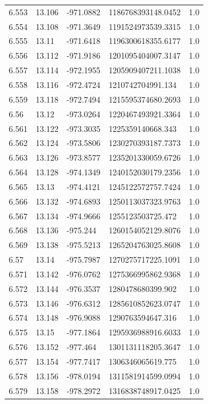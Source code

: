 \begin{tabular}{lllll}
6.553 & 13.106 & -971.0882 & 1186768393148.0452 & 1.0 \\
6.554 & 13.108 & -971.3649 & 1191524973539.3315 & 1.0 \\
6.555 & 13.11 & -971.6418 & 1196300618355.6177 & 1.0 \\
6.556 & 13.112 & -971.9186 & 1201095404007.3147 & 1.0 \\
6.557 & 13.114 & -972.1955 & 1205909407211.1038 & 1.0 \\
6.558 & 13.116 & -972.4724 & 1210742704991.134 & 1.0 \\
6.559 & 13.118 & -972.7494 & 1215595374680.2693 & 1.0 \\
6.56 & 13.12 & -973.0264 & 1220467493921.3364 & 1.0 \\
6.561 & 13.122 & -973.3035 & 1225359140668.343 & 1.0 \\
6.562 & 13.124 & -973.5806 & 1230270393187.7373 & 1.0 \\
6.563 & 13.126 & -973.8577 & 1235201330059.6726 & 1.0 \\
6.564 & 13.128 & -974.1349 & 1240152030179.2356 & 1.0 \\
6.565 & 13.13 & -974.4121 & 1245122572757.7424 & 1.0 \\
6.566 & 13.132 & -974.6893 & 1250113037323.9763 & 1.0 \\
6.567 & 13.134 & -974.9666 & 1255123503725.472 & 1.0 \\
6.568 & 13.136 & -975.244 & 1260154052129.8076 & 1.0 \\
6.569 & 13.138 & -975.5213 & 1265204763025.8608 & 1.0 \\
6.57 & 13.14 & -975.7987 & 1270275717225.1091 & 1.0 \\
6.571 & 13.142 & -976.0762 & 1275366995862.9368 & 1.0 \\
6.572 & 13.144 & -976.3537 & 1280478680399.902 & 1.0 \\
6.573 & 13.146 & -976.6312 & 1285610852623.0747 & 1.0 \\
6.574 & 13.148 & -976.9088 & 1290763594647.316 & 1.0 \\
6.575 & 13.15 & -977.1864 & 1295936988916.6033 & 1.0 \\
6.576 & 13.152 & -977.464 & 1301131118205.3647 & 1.0 \\
6.577 & 13.154 & -977.7417 & 1306346065619.775 & 1.0 \\
6.578 & 13.156 & -978.0194 & 1311581914599.0994 & 1.0 \\
6.579 & 13.158 & -978.2972 & 1316838748917.0425 & 1.0 \\

\end{tabular}
